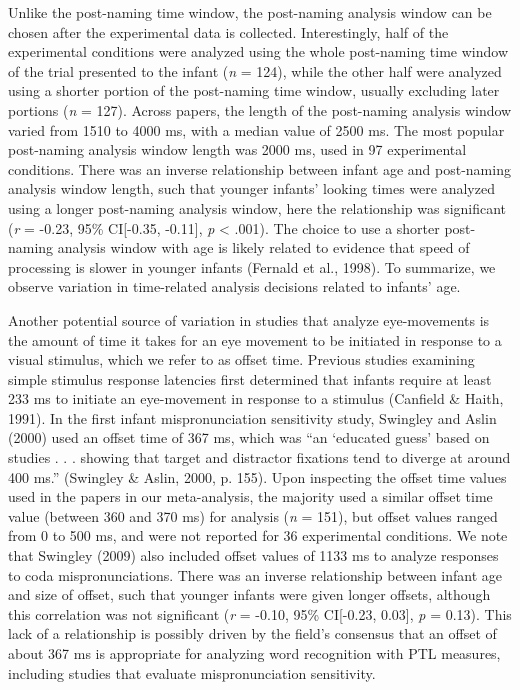 \documentclass[man]{apa6}
\begin{document}
Unlike the post-naming time window, the post-naming analysis window can be chosen after the experimental data is collected. Interestingly, half of the experimental conditions were analyzed using the whole post-naming time window of the trial presented to the infant (\emph{n} = 124), while the other half were analyzed using a shorter portion of the post-naming time window, usually excluding later portions (\emph{n} = 127). Across papers, the length of the post-naming analysis window varied from 1510 to 4000 ms, with a median value of 2500 ms.
The most popular post-naming analysis window length was 2000 ms, used in 97 experimental conditions. There was an inverse relationship between infant age and post-naming analysis window length, such that younger infants' looking times were analyzed using a longer post-naming analysis window, here the relationship was significant (\emph{r} = -0.23, 95\% CI{[}-0.35, -0.11{]}, \emph{p} \textless{} .001). The choice to use a shorter post-naming analysis window with age is likely related to evidence that speed of processing is slower in younger infants (Fernald et al., 1998). To summarize, we observe variation in time-related analysis decisions related to infants' age.

Another potential source of variation in studies that analyze eye-movements is the amount of time it takes for an eye movement to be initiated in response to a visual stimulus, which we refer to as offset time. Previous studies examining simple stimulus response latencies first determined that infants require at least 233 ms to initiate an eye-movement in response to a stimulus (Canfield \& Haith, 1991). In the first infant mispronunciation sensitivity study, Swingley and Aslin (2000) used an offset time of 367 ms, which was \enquote{an \enquote{educated guess} based on studies . . . showing that target and distractor fixations tend to diverge at around 400 ms.} (Swingley \& Aslin, 2000, p. 155). Upon inspecting the offset time values used in the papers in our meta-analysis, the majority used a similar offset time value (between 360 and 370 ms) for analysis (\emph{n} = 151), but offset values ranged from 0 to 500 ms, and were not reported for 36 experimental conditions. We note that Swingley (2009) also included offset values of 1133 ms to analyze responses to coda mispronunciations. There was an inverse relationship between infant age and size of offset, such that younger infants were given longer offsets, although this correlation was not significant (\emph{r} = -0.10, 95\% CI{[}-0.23, 0.03{]}, \emph{p} = 0.13). This lack of a relationship is possibly driven by the field's consensus that an offset of about 367 ms is appropriate for analyzing word recognition with PTL measures, including studies that evaluate mispronunciation sensitivity.
\end{document}
